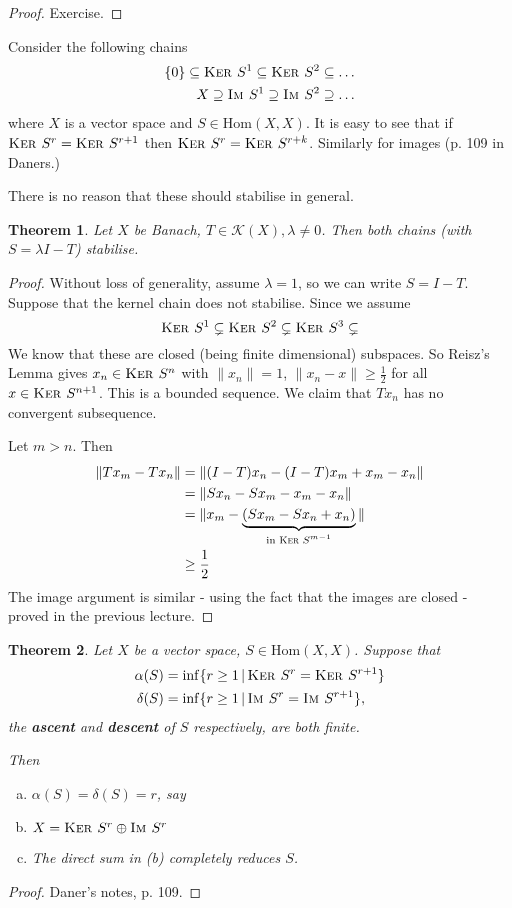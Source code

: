 \documentclass[10pt, oneside, reqno]{amsart}
\theoremstyle{plain}%
\newtheorem{thm}{Theorem}[section]
\theoremstyle{definition}
\theoremstyle{remark}
\newcommand{\given}{ \, | \,}
\newcommand{\im}{\textsc{Im\ }}
\renewcommand{\ker}{\textsc{Ker\ }}
\begin{document}
\begin{proof}
	Exercise.
\end{proof}

Consider the following chains \begin{align*}
	\{ 0 \} \subseteq \ker S^1 \subseteq \ker S^2 \subseteq \dots \\
	X \supseteq \im S^1 \supseteq \im S^2 \supseteq \dots
\end{align*} where $X$ is a vector space and $S \in \text{Hom}(X, X)$.  It is easy to see that if $\ker S^r = \ker S^{r+1}$ then $\ker S^r = \ker S^{r+k}$.  Similarly for images (p. 109 in Daners.)

There is no reason that these should stabilise in general.
\begin{thm}
	Let $X$ be Banach, $T \in \mathcal K(X), \lambda \neq 0$.  Then both chains (with $S = \lambda I - T$) stabilise.  
\end{thm}
\begin{proof}
	 Without loss of generality, assume $\lambda = 1$, so we can write $S = I - T$.  Suppose that the kernel chain does not stabilise.  Since we assume \[
	 	\ker S^1 \subsetneq \ker S^2 \subsetneq \ker S^3 \subsetneq
	 \]  We know that these are closed (being finite dimensional) subspaces.  So Reisz's Lemma gives $x_n \in \ker S^n$ with $\| x_n \| = 1$, $\|x_n - x \| \geq \frac{1}{2}$ for all $x \in \ker S^{n+1}$. This is a bounded sequence.  We claim that $T x_n$ has no convergent subsequence.  
	
	Let $m > n$.  Then \begin{align*}
		\| Tx_m - Tx_n \| 	&= \| ( I - T) x_n - (I-T) x_m + x_m - x_n \| \\
							&= \| Sx_n - Sx_m - x_m - x_n \|\\
							&= \| x_m - \underbrace{(S x_m  - S x_n  + x_n)}_\text{in $\ker S^{m-1}$} \| \\
							&\geq \frac{1}{2}
	\end{align*}  The image argument is similar - using the fact that the images are closed - proved in the previous lecture.
\end{proof}

\begin{thm}
	Let $X$ be a vector space, $S \in \text{Hom}(X, X)$.  Suppose that \begin{align*}
		\alpha(S) &= \inf \{ r \geq 1 \given \ker S^r = \ker S^{r+1} \} \\
		\delta(S) &= \inf \{ r \geq 1 \given \im S^r = \im S^{r+1} \},
	\end{align*} the \textbf{ascent} and \textbf{descent} of $S$ respectively, are both finite.  
	
	Then \begin{enumerate}[(a)]
		\item $\alpha(S) = \delta(S) = r$, say
		\item $X = \ker S^r \oplus \im S^r$
		\item The direct sum in (b) completely reduces $S$. 
	\end{enumerate} 
\end{thm}
\begin{proof}
	Daner's notes, p. 109.
\end{proof}
\end{document}
